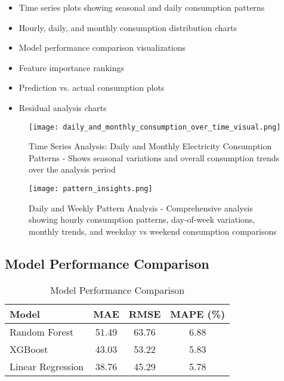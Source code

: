 \documentclass[12pt,a4paper]{article}
\begin{document}
\begin{itemize}
    \item Time series plots showing seasonal and daily consumption patterns
    \item Hourly, daily, and monthly consumption distribution charts
    \item Model performance comparison visualizations
    \item Feature importance rankings
    \item Prediction vs. actual consumption plots
    \item Residual analysis charts
\end{itemize}

\begin{figure}[H]
    \centering
    \texttt{[image: daily\_and\_monthly\_consumption\_over\_time\_visual.png]}
    \caption{Time Series Analysis: Daily and Monthly Electricity Consumption Patterns - Shows seasonal variations and overall consumption trends over the analysis period}
    \label{fig:consumption_timeseries}
\end{figure}

\begin{figure}[H]
    \centering
    \texttt{[image: pattern\_insights.png]}
    \caption{Daily and Weekly Pattern Analysis - Comprehensive analysis showing hourly consumption patterns, day-of-week variations, monthly trends, and weekday vs weekend consumption comparisons}
    \label{fig:pattern_insights}
\end{figure}

\subsection{Model Performance Comparison}
\begin{table}[H]
\centering
\caption{Model Performance Comparison}
\begin{tabular}{@{}lccc@{}}
\toprule
\textbf{Model} & \textbf{MAE} & \textbf{RMSE} & \textbf{MAPE (\%)} \\
\midrule
Random Forest & 51.49 & 63.76 & 6.88 \\
XGBoost & 43.03 & 53.22 & 5.83 \\
Linear Regression & 38.76 & 45.29 & 5.78 \\
\bottomrule
\end{tabular}
\label{tab:model_performance}
\end{table}
\end{document}
